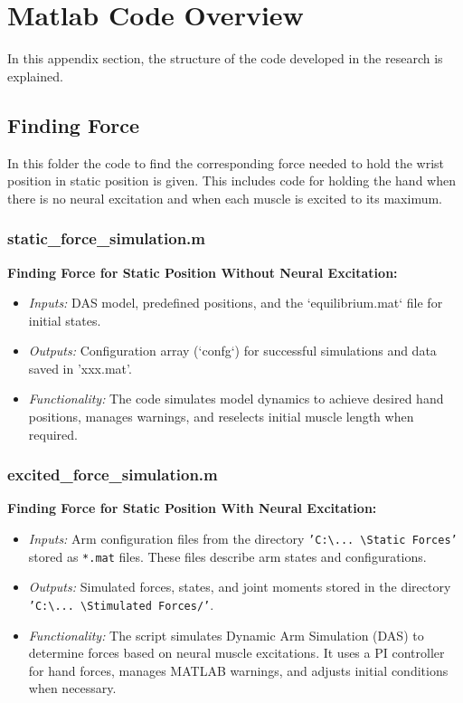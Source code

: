 \chapter{Matlab Code Overview}
In this appendix section, the structure of the code developed in the research is explained.
\section{Finding Force}
In this folder the code to find the corresponding force needed to hold the wrist position in static position is given. This includes code for holding the hand when there is no neural excitation and when each muscle is excited to its maximum.

\subsection{static\_force\_simulation.m}
\textbf{Finding Force for Static Position Without Neural Excitation:}
\begin{itemize}
    \item \textit{Inputs:} DAS model, predefined positions, and the `equilibrium.mat` file for initial states.
    \item \textit{Outputs:} Configuration array (`confg`) for successful simulations and data saved in 'xxx.mat'.
    \item \textit{Functionality:} The code simulates model dynamics to achieve desired hand positions, manages warnings, and reselects initial muscle length when required.
\end{itemize}

\subsection{excited\_force\_simulation.m}
\textbf{Finding Force for Static Position With Neural Excitation:}

\begin{itemize}
    \item \textit{Inputs:} Arm configuration files from the directory \texttt{'C:\textbackslash ... \textbackslash Static Forces'} stored as \texttt{*.mat} files. These files describe arm states and configurations.
    \item \textit{Outputs:} Simulated forces, states, and joint moments stored in the directory \texttt{'C:\textbackslash ... \textbackslash Stimulated Forces/'}.
    \item \textit{Functionality:} The script simulates Dynamic Arm Simulation (DAS) to determine forces based on neural muscle excitations. It uses a PI controller for hand forces, manages MATLAB warnings, and adjusts initial conditions when necessary.
\end{itemize}

